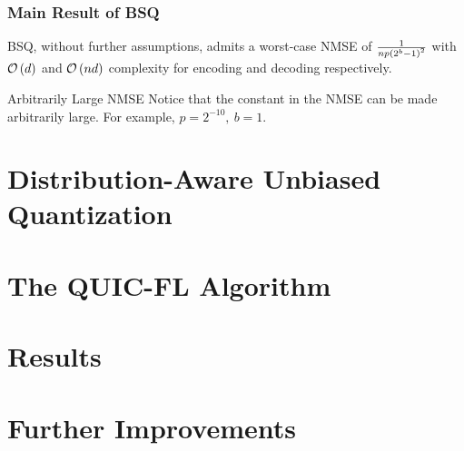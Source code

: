 \documentclass{beamer}
\begin{document}
    \begin{frame}
        \frametitle{Main Result of BSQ}
        \begin{theorem}
            BSQ, without further assumptions, admits a worst-case NMSE of
            \(\frac{1}{np\left(2^b-1\right)^2}\) with \(\mathcal O\left(d\right)\) and
            \(\mathcal O\left(nd\right)\) complexity for encoding and decoding respectively.
        \end{theorem}
        \begin{alertblock}{Arbitrarily Large NMSE}
            Notice that the constant in the NMSE can be made arbitrarily large.
            For example, \(p = 2^{-10},\ b = 1\).
        \end{alertblock}
    \end{frame}
    
    \section{Distribution-Aware Unbiased Quantization}
    
    \section{The QUIC-FL Algorithm}
    
    \section{Results}
    
    \section{Further Improvements}
\end{document}
